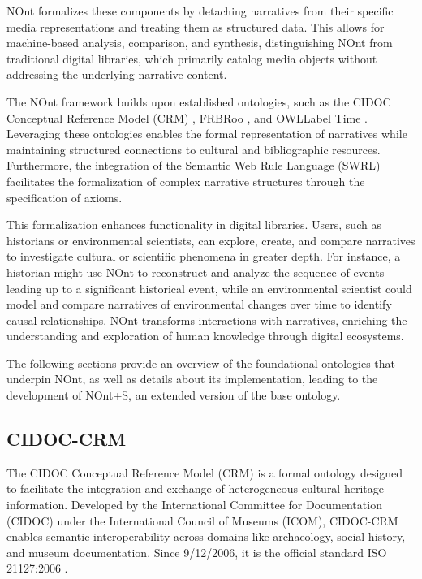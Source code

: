 NOnt formalizes these components by detaching narratives from their specific media representations and treating them as structured data. This allows for machine-based analysis, comparison, and synthesis, distinguishing NOnt from traditional digital libraries, which primarily catalog media objects without addressing the underlying narrative content.

The NOnt framework builds upon established ontologies, such as the CIDOC Conceptual Reference Model (CRM) \cite{doerrCIDOCConceptualReference2007a}, FRBRoo \cite{doerrFRBROOCONCEPTUALMODEL2008}, and \acrshort{OWLLabel} Time \cite{TimeOntologyOWL}. Leveraging these ontologies enables the formal representation of narratives while maintaining structured connections to cultural and bibliographic resources. Furthermore, the integration of the Semantic Web Rule Language (SWRL) facilitates the formalization of complex narrative structures through the specification of axioms.

This formalization enhances functionality in digital libraries. Users, such as historians or environmental scientists, can explore, create, and compare narratives to investigate cultural or scientific phenomena in greater depth. For instance, a historian might use NOnt to reconstruct and analyze the sequence of events leading up to a significant historical event, while an environmental scientist could model and compare narratives of environmental changes over time to identify causal relationships. NOnt transforms interactions with narratives, enriching the understanding and exploration of human knowledge through digital ecosystems.

The following sections provide an overview of the foundational ontologies that underpin NOnt, as well as details about its implementation, leading to the development of NOnt+S, an extended version of the base ontology.


\subsection{CIDOC-CRM}\label{III-subsec:cidoccrm}

The CIDOC Conceptual Reference Model (CRM)\cite{doerrCIDOCConceptualReference2007a} is a formal ontology designed to facilitate the integration and exchange of heterogeneous cultural heritage information. Developed by the International Committee for Documentation (CIDOC) under the International Council of Museums (ICOM), CIDOC-CRM enables semantic interoperability across domains like archaeology, social history, and museum documentation. Since 9/12/2006, it is the official standard ISO 21127:2006 \cite{ISO211272023}.

